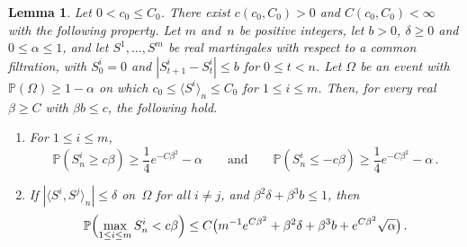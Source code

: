 \documentclass[11pt]{amsart}
\theoremstyle{plain}
\newtheorem{lemma}[theorem]{Lemma}
\theoremstyle{definition}
\renewcommand{\P}{\mathbb P}
\numberwithin{equation}{section}
\begin{document}
\begin{lemma}\label{lem:exp-deviation}
Let $0<c_0\leq C_0$. There exist $c(c_0,C_0)>0$ and $C(c_0,C_0)<\infty$ with the following property. Let $m$ and~$n$ be positive integers, let $b>0$, $\delta\geq0$ and $0\leq\alpha\leq1$, and let $S^1,\ldots,S^m$ be real martingales with respect to a common filtration, with $S^i_0=0$ and $|S^i_{t+1}-S^i_t|\leq b$ for $0\leq t<n$. Let $\Omega$ be an event with $\P(\Omega)\geq1-\alpha$ on which $c_0\leq\langle S^i\rangle_n\leq C_0$ for $1\leq i\leq m$. Then, for every real $\beta\geq C$ with $\beta b\leq c$, the following hold.
\begin{enumerate}[label=\textup{(\roman*)}]
\item For $1\leq i\leq m$,
\begin{equation*}
\P(S^i_n\geq c\beta)\geq\frac14e^{-C\beta^2}-\alpha
\qquad\text{and}\qquad
\P(S^i_n\leq-c\beta)\geq\frac14e^{-C\beta^2}-\alpha\, .
\end{equation*}
\item If $|\langle S^i,S^j\rangle_n|\leq\delta$ on~$\Omega$ for all $i\neq j$, and $\beta^2\delta+\beta^3b\leq1$, then
\begin{equation*}
\P\Bigl(\max_{1\leq i\leq m}S^i_n<c\beta\Bigr)\leq C\bigl(m^{-1}e^{C\beta^2}+\beta^2\delta+\beta^3b+e^{C\beta^2}\sqrt\alpha\bigr)\, .
\end{equation*}
\end{enumerate}
\end{lemma}
\end{document}
